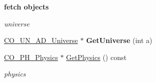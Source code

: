 \begin{Indent}{\bf fetch objects}\par
{\em \label{_amgrpb712734d7b6a37d417e36727149b52a3}
 universe }\begin{DoxyCompactItemize}
\item 
\hypertarget{classContent_1_1Content_aa4c478b9219b1e2ca2ab56e1a5ce407b}{
\hyperlink{classContent_1_1Universe_1_1Admin_1_1Universe}{CO\_\-UN\_\-AD\_\-Universe} $\ast$ {\bfseries GetUniverse} (int a)}
\label{classContent_1_1Content_aa4c478b9219b1e2ca2ab56e1a5ce407b}

\item 
\hypertarget{classContent_1_1Content_a86b85b9af39a4844450032cb0953529b}{
\hyperlink{classContent_1_1Physics_1_1Physics}{CO\_\-PH\_\-Physics} $\ast$ \hyperlink{classContent_1_1Content_a86b85b9af39a4844450032cb0953529b}{GetPhysics} () const }
\label{classContent_1_1Content_a86b85b9af39a4844450032cb0953529b}

\begin{DoxyCompactList}\small\item\em physics \item\end{DoxyCompactList}\end{DoxyCompactItemize}
\end{Indent}
